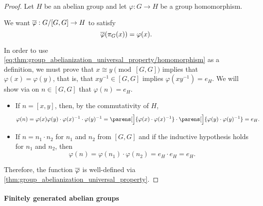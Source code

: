 \begin{proof}
  Let \( H \) be an abelian group and let \( \varphi: G \to H \) be a group homomorphism.

  We want \( \oline{\varphi}: G / [G, G] \to H \) to satisfy
  \begin{equation}\label{eq:thm:group_abelianization_universal_property/homomorphism}
    \oline{\varphi}(\pi_G(x)) = \varphi(x).
  \end{equation}

  In order to use \eqref{eq:thm:group_abelianization_universal_property/homomorphism} as a definition, we must prove that \( x \cong y \pmod {[G, G]} \) implies that \( \varphi(x) = \varphi(y) \), that is, that \( xy^{-1} \in [G, G] \) implies \( \varphi(xy^{-1}) = e_H \). We will show via  on \( n \in [G, G] \) that \( \varphi(n) = e_H \).
  \begin{itemize}
    \item If \( n = [x, y] \), then, by the commutativity of \( H \),
    \begin{equation*}
      \varphi(n)
      =
      \varphi(x) \varphi(y) \cdot \varphi(x)^{-1} \cdot \varphi(y)^{-1}
      =
      \parens[\Big]{ \varphi(x) \cdot \varphi(x)^{-1} } \cdot \parens[\Big]{ \varphi(y) \cdot \varphi(y)^{-1} }
      =
      e_H.
    \end{equation*}

    \item If \( n = n_1 \cdot n_2 \) for \( n_1 \) and \( n_2 \) from \( [G, G] \) and if the inductive hypothesis holds for \( n_1 \) and \( n_2 \), then
    \begin{equation*}
      \varphi(n)
      =
      \varphi(n_1) \cdot \varphi(n_2)
      =
      e_H \cdot e_H
      =
      e_H.
    \end{equation*}
  \end{itemize}

  Therefore, the function \( \oline{\varphi} \) is well-defined via \eqref{thm:group_abelianization_universal_property}.
\end{proof}

\paragraph{Finitely generated abelian groups}

